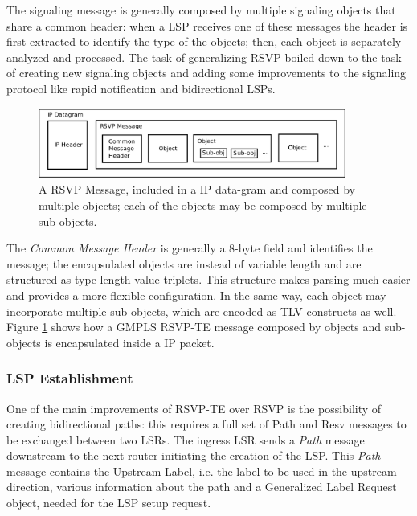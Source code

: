 \documentclass[10pt,a4paper]{report}
\begin{document}
The signaling message is generally composed by multiple signaling
objects that share a common header: when a LSP receives one of these
messages the header is first extracted to identify the type of the
objects; then, each object is separately analyzed and processed. The
task of generalizing RSVP boiled down to the task of creating new
signaling objects and adding some improvements to the signaling
protocol like rapid notification and bidirectional LSPs.

\begin{figure}[!htbp]
  \centering
  \includegraphics[width=0.9\textwidth]{img/rsvp_message}
  \caption[RSVP Message]{A RSVP Message, included in a IP data-gram and
  composed by multiple objects; each of the objects may be composed by
multiple sub-objects.}
  \label{fig:rsvp_message}
\end{figure}

The \textit{Common Message Header} is generally a 8-byte field and
identifies the message; the encapsulated objects are instead of
variable length and are structured as type-length-value triplets. This
structure makes parsing much easier and provides a more flexible
configuration. In the same way, each object may incorporate multiple
sub-objects, which are encoded as TLV constructs as well. Figure
\ref{fig:rsvp_message} shows how a GMPLS RSVP-TE message composed by
objects and sub-objects is encapsulated inside a IP packet.

\subsubsection{LSP Establishment}
One of the main improvements of RSVP-TE over RSVP is the possibility
of creating bidirectional paths: this requires a full set of Path and
Resv messages to be exchanged between two LSRs. The ingress LSR sends
a \textit{Path} message downstream to the next router initiating the
creation of the LSP. This \textit{Path} message contains the Upstream
Label, i.e. the label to be used in the upstream direction, various
information about the path and a Generalized Label Request object,
needed for the LSP setup request.
\end{document}
